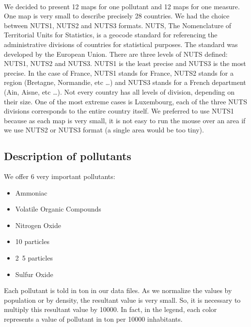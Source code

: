 \documentclass[preprint,journal]{vgtc}       %
\begin{document}
	\paragraph{}
We decided to present 12 maps for one pollutant and 12 maps for one measure. One map is very small to describe precisely 28 countries. We had the choice between NUTS1, NUTS2 and NUTS3 formats.
	\newline
NUTS, The Nomenclature of Territorial Units for Statistics, is a geocode standard for referencing the administrative divisions of countries for statistical purposes. The standard was developed by the European Union. There are three levels of NUTS defined: NUTS1, NUTS2 and NUTS3. NUTS1 is the least precise and NUTS3 is the most precise.
\newline
In the case of France, NUTS1 stands for France, NUTS2 stands for a region (Bretagne, Normandie, etc …) and NUTS3 stands for a French department (Ain, Aisne, etc …). Not every country has all levels of division, depending on their size. One of the most extreme cases is Luxembourg, each of the three NUTS divisions corresponds to the entire country itself.
\newline
We preferred to use NUTS1 because as each map is very small, it is not easy to run the mouse over an area if we use NUTS2 or NUTS3 format (a single area would be too tiny).

	\subsection{Description of pollutants}
	We offer 6 very important pollutants:
	\begin{itemize}
	\item Ammoniac
	\item Volatile Organic Compounds
	\item Nitrogen Oxide
	\item \unit{10}{\micro\meter} particles
	\item \unit{2.5}{\micro\meter} particles
	\item Sulfur Oxide
	\end{itemize}
\newline
Each pollutant is told in ton in our data files. As we normalize the values by population or by density, the resultant value is very small. So, it is necessary to multiply this resultant value by 10000. 
\newline
In fact, in the legend, each color represents a value of pollutant in ton per 10000 inhabitants.
\end{document}
